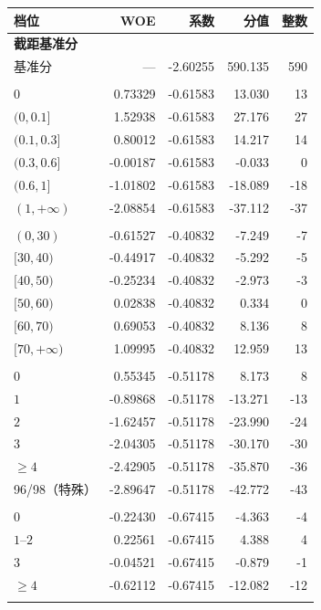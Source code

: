 \begin{minipage}[t]{0.49\linewidth}
\vspace{0pt}
\centering
\begin{tabular}{lrrrr}
\toprule
档位 & WOE & 系数 & 分值 & 整数 \\
\midrule
\multicolumn{5}{l}{\textbf{截距基准分}}\\
基准分 & --- & -2.60255 & 590.135 & 590 \\
\addlinespace[1pt]
\multicolumn{5}{l}{\textbf{额度使用率}}\\
$0$ & 0.73329 & -0.61583 & 13.030 & 13 \\
$(0,0.1]$ & 1.52938 & -0.61583 & 27.176 & 27 \\
$(0.1,0.3]$ & 0.80012 & -0.61583 & 14.217 & 14 \\
$(0.3,0.6]$ & -0.00187 & -0.61583 & -0.033 & 0 \\
$(0.6,1]$ & -1.01802 & -0.61583 & -18.089 & -18 \\
$(1,+\infty)$ & -2.08854 & -0.61583 & -37.112 & -37 \\
\addlinespace[1pt]
\multicolumn{5}{l}{\textbf{年龄}}\\
$(0,30)$ & -0.61527 & -0.40832 & -7.249 & -7 \\
$[30,40)$ & -0.44917 & -0.40832 & -5.292 & -5 \\
$[40,50)$ & -0.25234 & -0.40832 & -2.973 & -3 \\
$[50,60)$ & 0.02838 & -0.40832 & 0.334 & 0 \\
$[60,70)$ & 0.69053 & -0.40832 & 8.136 & 8 \\
$[70,+\infty)$ & 1.09995 & -0.40832 & 12.959 & 13 \\
\addlinespace[1pt]
\multicolumn{5}{l}{\textbf{30–59 天逾期次数}}\\
$0$ & 0.55345 & -0.51178 & 8.173 & 8 \\
$1$ & -0.89868 & -0.51178 & -13.271 & -13 \\
$2$ & -1.62457 & -0.51178 & -23.990 & -24 \\
$3$ & -2.04305 & -0.51178 & -30.170 & -30 \\
$\geq 4$ & -2.42905 & -0.51178 & -35.870 & -36 \\
96/98（特殊） & -2.89647 & -0.51178 & -42.772 & -43 \\
\addlinespace[1pt]
\multicolumn{5}{l}{\textbf{房地产贷款数}}\\
$0$ & -0.22430 & -0.67415 & -4.363 & -4 \\
$1$--$2$ & 0.22561 & -0.67415 & 4.388 & 4 \\
$3$ & -0.04521 & -0.67415 & -0.879 & -1 \\
$\geq 4$ & -0.62112 & -0.67415 & -12.082 & -12 \\
\addlinespace[1pt]
\bottomrule
\end{tabular}
\end{minipage}%
